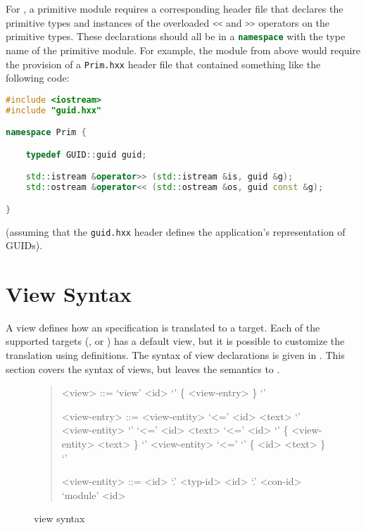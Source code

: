 For \Cplusplus{}, a primitive module requires a corresponding header file that declares
the primitive types and instances of the overloaded \lstinline[language=c++]!<<! and
\lstinline[language=c++]!>>! operators on the primitive types.  These declarations should
all be in a \lstinline[language=c++]!namespace! with the type name of the primitive module.
For example, the module from above would require the provision of a \texttt{Prim.hxx} header
file that contained something like the following code:
%
\begin{code}\begin{lstlisting}[language=c++]
#include <iostream>
#include "guid.hxx"

namespace Prim {

    typedef GUID::guid guid;

    std::istream &operator>> (std::istream &is, guid &g);
    std::ostream &operator<< (std::ostream &os, guid const &g);

}
\end{lstlisting}\end{code}%
(assuming that the \texttt{guid.hxx} header defines the application's representation
of GUIDs).


\section{View Syntax}
\label{sec:view-syntax}

A view defines how an \asdl{} specification is translated to a target.
Each of the supported targets (\eg{}, \sml{} or \Cplusplus{}) has a default
view, but it is possible to customize the translation using 
definitions.
The syntax of view declarations is given in .
This section covers the syntax of views, but leaves the semantics to
.

\begin{figure}[t]
  \begin{quote}
    \begin{grammar}
      <view>        ::= `view' <id> `{' \{ <view-entry> \} `}'

      <view-entry>  ::= <view-entity>  `<=' <id> <text>
         \alt{} `{' {<view-entity>} `}' `<=' <id> <text>
         \alt{} `<=' <id> `{' \{ <view-entity> <text> \} `}'
         \alt{} <view-entity> `<=' `{' \{ <id> <text> \} `}'

      <view-entity> ::= <id> `.' <typ-id>
         \alt{} <id> `.' <con-id>
         \alt{} `module' <id>
    \end{grammar}%
  \end{quote}%
  \caption{\asdl{} view syntax}
  \label{fig:view-syntax}
\end{figure}%

